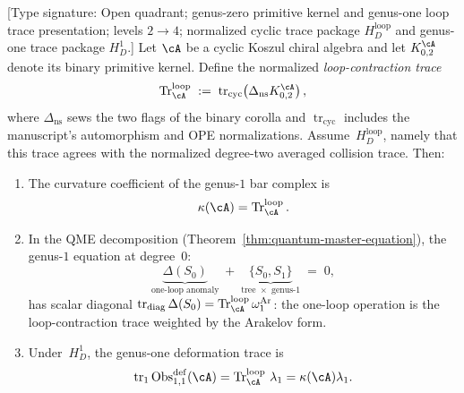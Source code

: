 \begin{theorem}\label{thm:curvature-self-contraction}
\textup{[Type signature: Open quadrant; genus-zero primitive kernel
and genus-one loop trace presentation; levels $2\to4$; normalized
cyclic trace package $H_D^{\mathrm{loop}}$ and genus-one trace package
$H_D^1$.]}
Let $\cA$ be a cyclic Koszul chiral algebra and let
$K_{0,2}^{\cA}$ denote its binary primitive kernel.  Define the
normalized \emph{loop-contraction trace}
\begin{equation}\label{eq:self-contraction-trace}
\operatorname{Tr}^{\mathrm{loop}}_\cA
\;:=\;
\operatorname{tr}_{\mathrm{cyc}}\!\left(
\Delta_{\mathrm{ns}}K_{0,2}^{\cA}\right),
\end{equation}
where $\Delta_{\mathrm{ns}}$ sews the two flags of the binary corolla
and $\operatorname{tr}_{\mathrm{cyc}}$ includes the manuscript's
automorphism and OPE normalizations.  Assume~$H_D^{\mathrm{loop}}$,
namely that this trace agrees with the normalized degree-two averaged
collision trace.
Then:
\begin{enumerate}[label=\textup{(\roman*)}]
\item The curvature coefficient of the genus-$1$ bar complex is
 \begin{equation}\label{eq:kappa-self-contraction}
 \kappa(\cA) = \operatorname{Tr}^{\mathrm{loop}}_\cA.
 \end{equation}

\item In the QME decomposition
 \textup{(}Theorem~\textup{\ref{thm:quantum-master-equation})},
 the genus-$1$ equation at degree~$0$:
 \begin{equation}\label{eq:qme-genus1}
 \underbrace{\Delta(S_0)}_{\text{one-loop anomaly}}
 \;+\;
 \underbrace{\{S_0, S_1\}}_{\text{tree $\times$ genus-$1$}}
 \;=\; 0,
 \end{equation}
 has scalar diagonal
 $\operatorname{tr}_{\mathrm{diag}}\Delta(S_0)
 =\operatorname{Tr}^{\mathrm{loop}}_\cA
 \omega_1^{\mathrm{Ar}}$: the one-loop
 operation is the loop-contraction trace weighted by the Arakelov
 form.

\item Under~$H_D^1$, the genus-one deformation trace is
 \[
 \operatorname{tr}_1\operatorname{Obs}^{\mathrm{def}}_{1,1}(\cA)
 =\operatorname{Tr}^{\mathrm{loop}}_\cA\,\lambda_1
 =\kappa(\cA)\lambda_1.
 \]
\end{enumerate}
\end{theorem}

